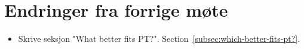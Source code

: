 
\chapter*{Endringer fra forrige møte}

\begin{itemize}
    \item Skrive seksjon "What better fits PT?".
    Section~\vref{subsec:which-better-fits-pt?}.
\end{itemize}


